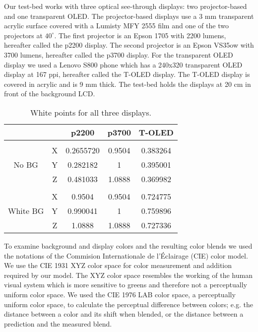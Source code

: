 \documentclass[annual]{acmsiggraph}
\begin{document}
Our test-bed works with three optical see-through displays: two projector-based and one transparent OLED. The projector-based displays use a 3 mm transparent acrylic surface covered with a Lumisty MFY 2555 film and one of the two projectors at $40^\circ$. The first projector is an Epson 1705 with 2200 lumens, hereafter called the p2200 display. The second projector is an Epson VS35ow with 3700 lumens, hereafter called the p3700 display. For the transparent OLED display we used a Lenovo S800 phone which has a 240x320 transparent OLED display at 167 ppi, hereafter called the T-OLED display. The T-OLED display is covered in acrylic and is 9 mm thick. The test-bed holds the displays at 20 cm in front of the background LCD.
\begin{table}[ht]
\caption{White points for all three displays.} %
\centering %
\begin{tabular}{c c c c c} %
\hline\hline %
 &  & p2200 & p3700 & T-OLED \\  %
\hline\hline\\  %
	   & X & 0.2655720 & 0.9504 & 0.383264\\ %
No BG  & Y & 0.282182 & 1 & 0.395001\\
	   & Z & 0.481033 & 1.0888 & 0.369982\\ [0.5ex]
\hline\\  %
		 & X & 0.9504 & 0.9504 & 0.724775\\
White BG & Y & 0.990041 & 1 & 0.759896\\
		 & Z & 1.0888 & 1.0888 & 0.727336\\ [0.5ex] %
\hline %
\end{tabular}
\label{table:1} %
\end{table}

To examine background and display colors and the resulting color blends we used the notations of the Commision Internationale de l'\'{E}clairage (CIE) color model. We use the CIE 1931 XYZ color space for color measurement and addition required by our model. The XYZ color space resembles the working of the human visual system which is more sensitive to greens and therefore not a perceptually uniform color space. We used the CIE 1976 LAB color space, a perceptually uniform color space, to calculate the perceptual difference between colors; e.g. the distance between a color and its shift when blended, or the distance between a prediction and the measured blend.
\end{document}
